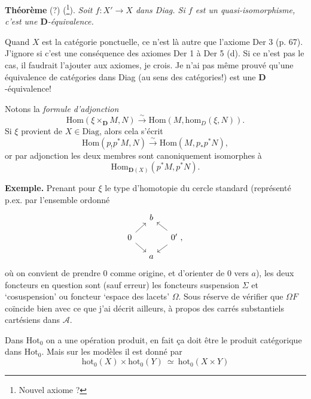 \documentclass[11pt]{article}
\newcommand{\msp}[1]{\marginpar{\footnotesize [#1]}}
\newcommand{\Hot}{\mathrm{Hot}}
\newcommand{\D}{\mathbf{D}}
\newcommand{\hm}{\mathrm{hom}}
\begin{document}
\textbf{Théorème} (?) (\footnote{Nouvel axiome ?}). \textit{Soit $f : X' \longrightarrow X$ dans Diag. Si $f$ est un quasi-isomorphisme, c'est une $\D$-équivalence.}

Quand $X$ est la catégorie ponctuelle, ce n'est là autre que l'axiome Der 3 (p. 67). J'ignore si c'est une conséquence des axiomes Der 1 à Der 5 (d). Si ce n'est pas le cas, il faudrait l'ajouter aux axiomes, je crois. Je n'ai pas même prouvé qu'une équivalence de catégories dans Diag (au sens des catégories!) est une $\D$-équivalence!

Notons la \textit{formule d'adjonction}
\[
\mathrm{Hom}(\xi \times_{\D} M, N) \xrightarrow{\sim} \mathrm{Hom}(M, \hm_D(\xi, N)).
\tag*{(7)}
\] %
Si $\xi$ provient de $X \in \mathrm{Diag}$, alors cela s'écrit
\[
\mathrm{Hom}(p_!p^*M, N) \xrightarrow{\sim} \mathrm{Hom}(M, p_*p^*N),
\tag*{(8)}
\]
\msp{page 5}
or par adjonction les deux membres sont canoniquement isomorphes à
\[
\mathrm{Hom}_{\D(X)}(p^*M, p^*N).
\]

\textbf{Exemple.} Prenant pour $\xi$ le type d'homotopie du cercle standard (représenté p.ex. par l'ensemble ordonné
\[
\begin{tikzcd}[row sep=small, column sep=small]
 & b & \\
0 \arrow[ur] \arrow[dr] & & 0' \arrow[ul] \arrow[dl] \ , \\
 & a &
\end{tikzcd}
\]
où on convient de prendre 0 comme origine, et d'orienter de 0 vers $a$), les deux foncteurs en question sont (sauf erreur) les foncteurs suspension $\Sigma$ et `cosuspension' ou foncteur `espace des lacets' $\Omega$. Sous réserve de vérifier que $\Omega F$ coïncide bien avec ce que j'ai décrit ailleurs, à propos des carrés substantiels cartésiens dans $\mathcal{A}$.

Dans $\Hot_0$ on a une opération produit, en fait ça doit être le produit catégorique dans $\Hot_0$. Mais sur les modèles il est donné par
\[
\mathrm{hot}_0(X) \times \mathrm{hot}_0(Y) \ \simeq \ \mathrm{hot}_0(X \times Y)
\tag*{(8)}
\] %
\end{document}
